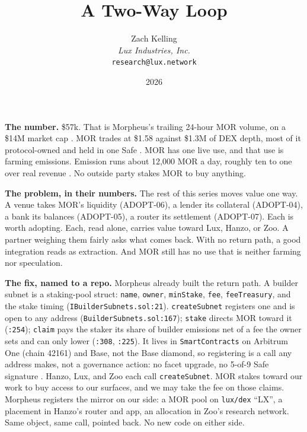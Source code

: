 \documentclass[11pt,a4paper]{article}
\title{A Two-Way Loop}
\author{Zach Kelling\\\textit{Lux Industries, Inc.}\\\texttt{research@lux.network}}
\date{2026}
\newcommand{\code}[1]{\texttt{\small #1}}
\newcommand{\prov}[1]{{\color{muted}\scriptsize\sffamily[#1]}}
\begin{document}
\luxcoverpage
\sloppy

\par
\vspace{0.9ex}

\noindent\textbf{The number.}
\$57k. That is Morpheus's trailing 24-hour MOR volume, on a \$14M market cap \prov{verified}. MOR
trades at \$1.58 against \$1.3M of DEX depth, most of it protocol-owned and held in one Safe
\prov{verified}. MOR has one live use, and that use is farming emissions. Emission runs about 12,000 MOR a
day, roughly ten to one over real revenue \prov{verified}. No outside party stakes MOR to buy
anything.

\vspace{0.35ex}
\noindent\textbf{The problem, in their numbers.}
The rest of this series moves value one way. A venue takes MOR's liquidity (ADOPT-06), a lender its
collateral (ADOPT-04), a bank its balances (ADOPT-05), a router its settlement (ADOPT-07). Each is
worth adopting. Each, read alone, carries value toward Lux, Hanzo, or Zoo. A partner weighing them
fairly asks what comes back. With no return path, a good integration reads as extraction. And MOR
still has no use that is neither farming nor speculation.

\vspace{0.35ex}
\noindent\textbf{The fix, named to a repo.}
Morpheus already built the return path. A builder subnet is a staking-pool struct: \code{name},
\code{owner}, \code{minStake}, \code{fee}, \code{feeTreasury}, and the stake timing
(\code{IBuilderSubnets.sol:21}). \code{createSubnet} registers one and is open to any address
(\code{BuilderSubnets.sol:167}); \code{stake} directs MOR toward it (\code{:254}); \code{claim} pays
the staker its share of builder emissions net of a fee the owner sets and can only lower
(\code{:308}, \code{:225}). It lives in \code{SmartContracts} on Arbitrum One (chain 42161) and
Base, not the Base diamond, so registering is a call any address makes, not a governance action: no
facet upgrade, no 5-of-9 Safe signature \prov{verified}. Hanzo, Lux, and Zoo each call
\code{createSubnet}. MOR stakes toward our work to buy access to our surfaces, and we may take the
fee on those claims. Morpheus registers the mirror on our side: a MOR pool on \code{lux/dex} ``LX'',
a placement in Hanzo's router and app, an allocation in Zoo's research network. Same object, same
call, pointed back. No new code on either side.
\end{document}

